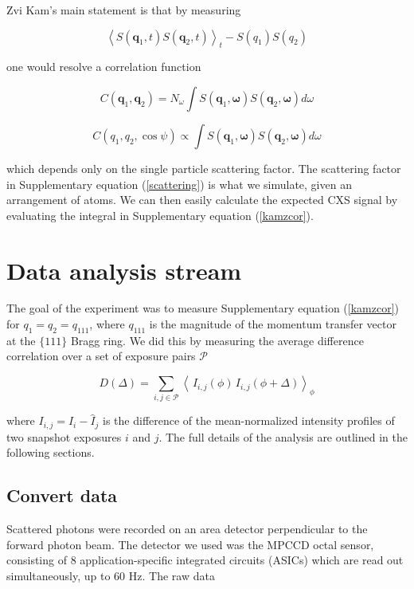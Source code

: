 \documentclass [12pt,fleqn]{article}
\def \be {\begin{equation}}
\def \ee {\end{equation}}
\begin{document}
Zvi Kam's main statement is that by measuring 

\be 
\left \langle S(\bm q_1, t )  S(\bm q_2, t )   \right \rangle_t - S( q_1 ) S( q_2 )
\ee

one would resolve a correlation function 

\be
C( \bm q_1, \bm q_2  ) = N_\omega \int S( \bm q_1, \bm \omega ) S( \bm q_2, \bm \omega ) d\omega
\ee

\be \label {kamzcor}
C( q_1, q_2, \cos \psi   ) \propto \int S( \bm q_1, \bm \omega ) S( \bm q_2, \bm \omega ) d\omega
\ee

which depends only on the single particle scattering factor.  The scattering factor in Supplementary equation (\ref{scattering}) is what we simulate, given an arrangement of atoms. We can then easily calculate the expected CXS signal by evaluating the integral in Supplementary equation (\ref{kamzcor}). 

\section{Data analysis stream}
The goal of the experiment was to measure Supplementary equation (\ref{kamzcor}) for $q_1 = q_2 = q_{111}$, where $q_{111}$ is the magnitude of the momentum transfer vector at the $\{111\}$ Bragg ring. We did this by measuring the average difference correlation over a set of exposure pairs $\mathcal P$

\begin{equation} \label{supp:c111}
D(\Delta) = \sum_{i,j \in \mathcal P}  \left \langle \,I_{i,j}( \phi) \,I_{i,j}(\phi +\Delta) \right \rangle _\phi
\end{equation}

where $I_{i,j} = \widehat I_i - \widehat I_j$ is the difference of the mean-normalized intensity profiles of two snapshot exposures $i$ and $j$. The full details of the analysis are outlined in the following sections.

\subsection{Convert data}
Scattered photons were recorded on an area detector perpendicular to the forward photon beam. The detector we used was the MPCCD octal sensor, consisting of 8 application-specific integrated circuits (ASICs) which are read out simultaneously, up to 60 Hz. The raw data 
\end{document}
